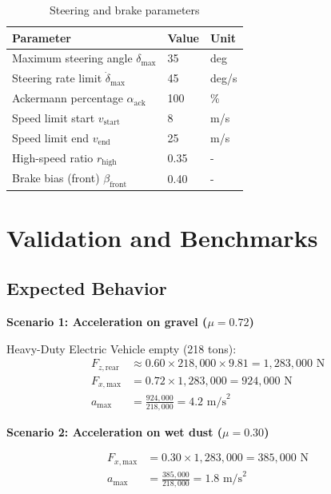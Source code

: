\documentclass[11pt,a4paper]{article}
\begin{document}
\begin{table}[H]
\centering
\begin{tabular}{lll}
\toprule
\textbf{Parameter} & \textbf{Value} & \textbf{Unit} \\
\midrule
Maximum steering angle $\delta_{\max}$ & 35 & deg \\
Steering rate limit $\dot{\delta}_{\max}$ & 45 & deg/s \\
Ackermann percentage $\alpha_{\text{ack}}$ & 100 & \% \\
Speed limit start $v_{\text{start}}$ & 8 & m/s \\
Speed limit end $v_{\text{end}}$ & 25 & m/s \\
High-speed ratio $r_{\text{high}}$ & 0.35 & - \\
Brake bias (front) $\beta_{\text{front}}$ & 0.40 & - \\
\bottomrule
\end{tabular}
\caption{Steering and brake parameters}
\end{table}

\section{Validation and Benchmarks}

\subsection{Expected Behavior}

\textbf{Scenario 1: Acceleration on gravel ($\mu = 0.72$)}

Heavy-Duty Electric Vehicle empty (218 tons):
\begin{align}
F_{z,\text{rear}} &\approx 0.60 \times 218{,}000 \times 9.81 = 1{,}283{,}000 \text{ N} \\
F_{x,\text{max}} &= 0.72 \times 1{,}283{,}000 = 924{,}000 \text{ N} \\
a_{\max} &= \frac{924{,}000}{218{,}000} = 4.2 \text{ m/s}^2
\end{align}

\textbf{Scenario 2: Acceleration on wet dust ($\mu = 0.30$)}

\begin{align}
F_{x,\text{max}} &= 0.30 \times 1{,}283{,}000 = 385{,}000 \text{ N} \\
a_{\max} &= \frac{385{,}000}{218{,}000} = 1.8 \text{ m/s}^2
\end{align}
\end{document}
